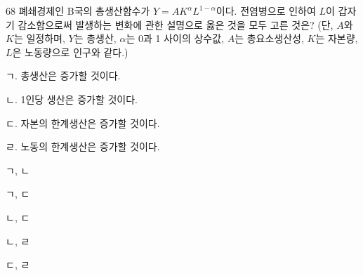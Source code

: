 \begin{question}{68}
폐쇄경제인 B국의 총생산함수가 $Y = AK^{\alpha}L^{1-\alpha}$이다. 전염병으로 인하여 $L$이 갑자기 감소함으로써 발생하는 변화에 관한 설명으로 옳은 것을 모두 고른 것은? (단, $A$와 $K$는 일정하며, $Y$는 총생산, $\alpha$는 0과 1 사이의 상수값, $A$는 총요소생산성, $K$는 자본량, $L$은 노동량으로 인구와 같다.)
\begin{framedtext}
ㄱ. 총생산은 증가할 것이다. \par
ㄴ. 1인당 생산은 증가할 것이다. \par
ㄷ. 자본의 한계생산은 증가할 것이다. \par
ㄹ. 노동의 한계생산은 증가할 것이다. \par
\end{framedtext}
\begin{choices}
  \item ㄱ, ㄴ
  \item ㄱ, ㄷ
  \item ㄴ, ㄷ
  \item ㄴ, ㄹ
  \item ㄷ, ㄹ
\end{choices}
\end{question}
